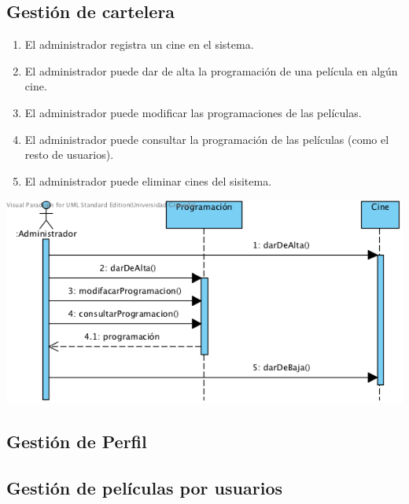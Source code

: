 \documentclass{article}
\begin{document}
	\subsection*{Gestión de cartelera}
	\begin{enumerate}
		\item El administrador registra un cine en el sistema.
		\item El administrador puede dar de alta la programación de una película en algún cine.
		\item El administrador puede modificar las programaciones de las películas.
		\item El administrador puede consultar la programación de las películas (como el resto de usuarios).
		\item El administrador puede eliminar cines del sisitema.
	\end{enumerate}
			\includegraphics[width=1\linewidth]{./Sec-Cartelera}

	\subsection*{Gestión de Perfil}
	\subsection*{Gestión de películas por usuarios}
\end{document}

